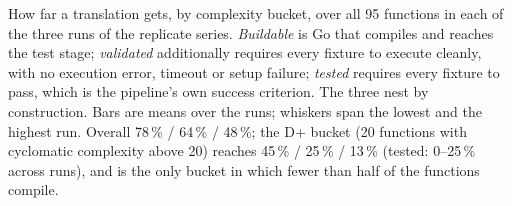\caption{How far a translation gets, by complexity bucket, over all 95
  functions in each of the three runs of the replicate series. \emph{Buildable} is Go that compiles and
  reaches the test stage; \emph{validated} additionally requires every fixture to
  execute cleanly, with no execution error, timeout or setup failure;
  \emph{tested} requires every fixture to pass, which is the pipeline's own
  success criterion. The three nest by construction. Bars are means over the runs; whiskers span the lowest and the highest run. Overall
  78\,\% / 64\,\% / 48\,\%; the D+ bucket (20 functions with
  cyclomatic complexity above 20) reaches 45\,\% / 25\,\% / 13\,\% (tested: 0--25\,\% across runs), and is the only bucket in which fewer than half of the functions compile.}
